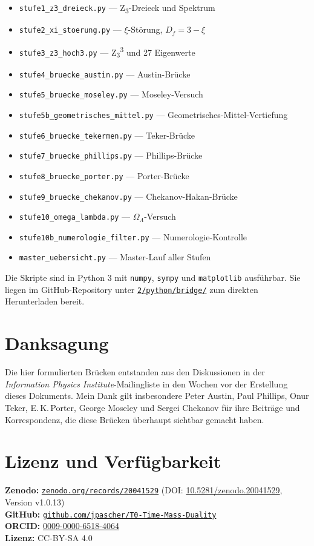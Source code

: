 \begin{itemize}
\item \texttt{stufe1\_z3\_dreieck.py} — Z\textsubscript{3}-Dreieck und Spektrum
\item \texttt{stufe2\_xi\_stoerung.py} — \(\xi\)-Störung, \(D_f = 3 - \xi\)
\item \texttt{stufe3\_z3\_hoch3.py} — Z\textsubscript{3}\textsuperscript{3} und 27 Eigenwerte
\item \texttt{stufe4\_bruecke\_austin.py} — Austin-Brücke
\item \texttt{stufe5\_bruecke\_moseley.py} — Moseley-Versuch
\item \texttt{stufe5b\_geometrisches\_mittel.py} — Geometrisches-Mittel-Vertiefung
\item \texttt{stufe6\_bruecke\_tekermen.py} — Teker-Brücke
\item \texttt{stufe7\_bruecke\_phillips.py} — Phillips-Brücke
\item \texttt{stufe8\_bruecke\_porter.py} — Porter-Brücke
\item \texttt{stufe9\_bruecke\_chekanov.py} — Chekanov-Hakan-Brücke
\item \texttt{stufe10\_omega\_lambda.py} — \(\Omega_\Lambda\)-Versuch
\item \texttt{stufe10b\_numerologie\_filter.py} — Numerologie-Kontrolle
\item \texttt{master\_uebersicht.py} — Master-Lauf aller Stufen
\end{itemize}

Die Skripte sind in Python 3 mit \texttt{numpy}, \texttt{sympy} und \texttt{matplotlib} ausführbar. Sie liegen im GitHub-Repository unter \href{https://github.com/jpascher/T0-Time-Mass-Duality/tree/main/2/python/bridge}{\texttt{2/python/bridge/}} zum direkten Herunterladen bereit.

\section*{Danksagung}

Die hier formulierten Brücken entstanden aus den Diskussionen in der \emph{Information Physics Institute}-Mailingliste in den Wochen vor der Erstellung dieses Dokuments. Mein Dank gilt insbesondere Peter Austin, Paul Phillips, Onur Teker, E.\,K.\,Porter, George Moseley und Sergei Chekanov für ihre Beiträge und Korrespondenz, die diese Brücken überhaupt sichtbar gemacht haben.

\section*{Lizenz und Verfügbarkeit}

\textbf{Zenodo:} \href{https://zenodo.org/records/20041529}{\texttt{zenodo.org/records/20041529}} (DOI: \href{https://doi.org/10.5281/zenodo.20041529}{10.5281/zenodo.20041529}, Version v1.0.13)\\
\textbf{GitHub:} \href{https://github.com/jpascher/T0-Time-Mass-Duality}{\texttt{github.com/jpascher/T0-Time-Mass-Duality}}\\
\textbf{ORCID:} \href{https://orcid.org/0009-0000-6518-4064}{0009-0000-6518-4064}\\
\textbf{Lizenz:} CC-BY-SA 4.0

